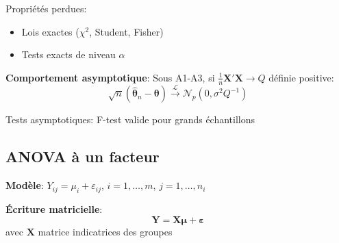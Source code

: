 \documentclass[8pt,twocolumn]{article}
\newcommand{\mydef}[1]{\textcolor{defcolor}{\textbf{#1}}}
\newcommand{\myprop}[1]{\textcolor{propcolor}{\textbf{#1}}}
\begin{document}
Propriétés perdues:
\begin{itemize}[nosep]
\item Lois exactes ($\chi^2$, Student, Fisher)
\item Tests exacts de niveau $\alpha$
\end{itemize}

\myprop{Comportement asymptotique}:
Sous A1-A3, si $\frac{1}{n}\mathbf{X}'\mathbf{X} \to Q$ définie positive:
$$\sqrt{n}(\hat{\boldsymbol{\theta}}_n - \boldsymbol{\theta}) \xrightarrow{\mathcal{L}} \mathcal{N}_p(0,\sigma^2 Q^{-1})$$

Tests asymptotiques: F-test valide pour grands échantillons

\subsection{ANOVA à un facteur}
\mydef{Modèle}: $Y_{ij} = \mu_i + \varepsilon_{ij}$, $i=1,\ldots,m$, $j=1,\ldots,n_i$

\mydef{Écriture matricielle}: 
$$\mathbf{Y} = \mathbf{X}\boldsymbol{\mu} + \boldsymbol{\varepsilon}$$
avec $\mathbf{X}$ matrice indicatrices des groupes
\end{document}
